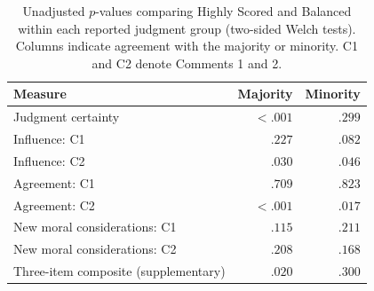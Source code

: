 \begin{table}[t]
  \centering
  \caption{Unadjusted $p$-values comparing Highly Scored and Balanced within each reported
  judgment group (two-sided Welch tests). Columns indicate agreement
  with the majority or minority. C1 and C2 denote Comments 1 and 2.}
  \label{tab:survey-alignment-tests}
  \small
  \begin{tabular}{@{}lrr@{}}
    \toprule
    Measure & Majority & Minority \\
    \midrule
    Judgment certainty & $<.001$ & $.299$ \\
    Influence: C1 & $.227$ & $.082$ \\
    Influence: C2 & $.030$ & $.046$ \\
    Agreement: C1 & $.709$ & $.823$ \\
    Agreement: C2 & $<.001$ & $.017$ \\
    New moral considerations: C1 & $.115$ & $.211$ \\
    New moral considerations: C2 & $.208$ & $.168$ \\
    Three-item composite (supplementary) & $.020$ & $.300$ \\
    \bottomrule
  \end{tabular}
\end{table}
